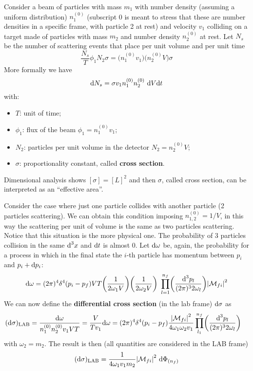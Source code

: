 \documentclass[TheoreticalPhy_ModB.tex]{subfiles}
\begin{document}
Consider a beam of particles with mass $m_1$ with number density (assuming a uniform distribution)  $n_1^{(0)}$ (subscript 0 is meant to stress that these are number densities in a specific frame, with particle 2 at rest) and velocity $v_1$ colliding on a target made of particles with mass $m_2$ and number density $n_2^{(0)}$ at rest.
Let $N_s$ be the number of scattering events that place per unit volume and per unit time
\[
\frac{N_s}{T} \phi_1 N_2 \sigma = \bigl( n_1^{(0)} v_1 \bigr) \bigl( n_2^{(0)} V \bigr) \sigma
\]
More formally we have
\[
\textup{d} N_s = \sigma v_1 n_1^{(0)} n_2^{(0)} \ \textup{d} V \textup{d} t
\]
with:
\begin{itemize}[label=$\bullet$]
\item $T$: unit of time;
\item $\phi_1$: flux of the beam $\phi_1 = n_1^{(0)} v_1$;
\item $N_2$: particles per unit volume in the detector $N_2 = n_2^{(0)}V$;
\item $\sigma$: proportionality constant, called \textbf{cross section}.
\end{itemize}
Dimensional analysis shows $[\sigma] = [L]^2$ and then $\sigma$, called cross section, can be interpreted as an ``effective area''.

Consider the case where just one particle collides with another particle (2 particles scattering). We can obtain this condition imposing $n_{1,2}^{(0)} = 1/V$, in this way the scattering per unit of volume is the same as two particles scattering.
Notice that this situation is the more physical one. The probability of 3 particles collision in the same $\textup{d}^3 x$ and $\textup{d} t$ is almost 0.
Let $\textup{d} \omega$ be, again, the probability for a process in which in the final state the $i$-th particle has momentum between $p_i$ and $p_i + \textup{d} p_i$:
\[
\textup{d} \omega = (2 \pi)^4 \delta^4 (p_i - p_f) VT \biggl( \frac{1}{2 \omega_1 V} \biggl) \biggl( \frac{1}{2 \omega_2 V} \biggr) \
	\prod_{l=1}^{n_f} \biggl( \frac{\textup{d}^3 p_l}{(2 \pi)^3 2 \omega_l} \biggr) \abs{\mathcal{M}_{fi}}^2
\]
We can now define the \textbf{differential cross section} (in the lab frame) $\textup{d} \sigma$ as
\[
\begin{split}
(\textup{d} \sigma)_{\textup{LAB}}	& = \frac{\textup{d} \omega}{n_1^{(0)} n_2^{(0)} v_1 VT}
						=\frac{V}{T v_1} \textup{d} \omega 
						= (2 \pi)^4 \delta^4 (p_i - p_f) \frac{\abs{\mathcal{M}_{fi}}^2}{4 \omega_1 \omega_2 v_1} \prod_{l_1}^{n_f} \biggl( \frac{\textup{d}^3 p_l}{(2 \pi)^3 2 \omega_l} \biggr)
\end{split}
\]
with $\omega_2 = m_2$. The result is then (all quantities are considered in the LAB frame)
\[
(\textup{d} \sigma)_{\textup{LAB}} = \frac{1}{4 \omega_1 v_1 m_2} \abs{\mathcal{M}_{fi}}^2 \ \textup{d} \Phi_{(n_f)}
\]
\end{document}
